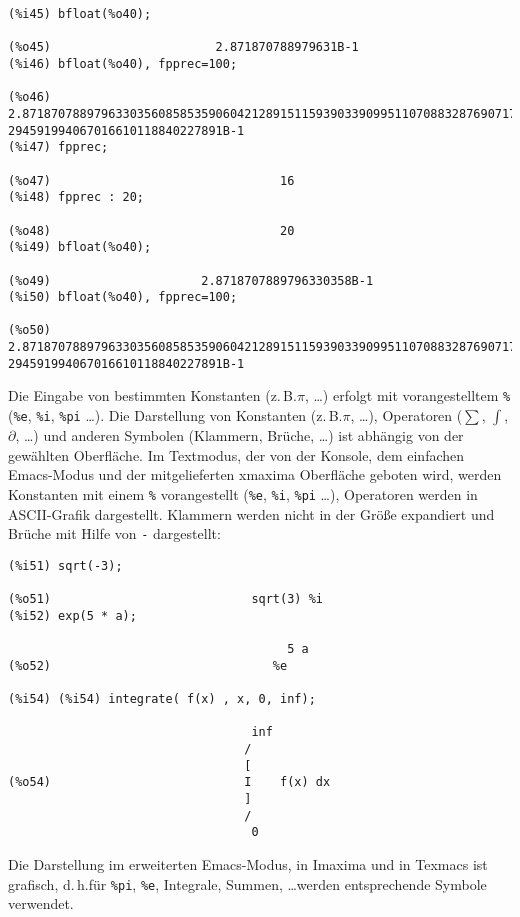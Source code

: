 \documentclass[12pt]{scrartcl}
\newcommand*\zB{z.\,B.\xspace}
\begin{document}
\begin{verbatim}
(%i45) bfloat(%o40);

(%o45)                       2.871870788979631B-1
(%i46) bfloat(%o40), fpprec=100;

(%o46) 2.871870788979633035608585359060421289151159390339099511070883287690717#
294591994067016610118840227891B-1
(%i47) fpprec;

(%o47)                                16
(%i48) fpprec : 20;

(%o48)                                20
(%i49) bfloat(%o40);

(%o49)                     2.8718707889796330358B-1
(%i50) bfloat(%o40), fpprec=100;

(%o50) 2.871870788979633035608585359060421289151159390339099511070883287690717#
294591994067016610118840227891B-1
\end{verbatim}

Die Eingabe von bestimmten Konstanten (\zB $\pi$, \ldots) erfolgt mit
vorangestelltem \texttt{\%} (\texttt{\%e}, \texttt{\%i}, \texttt{\%pi} \ldots).
Die Darstellung von Konstanten (\zB $\pi$, \ldots), Operatoren
($\sum$, $\int$, $\partial$, \ldots) und anderen Symbolen (Klammern,
Brüche, \ldots) ist abhängig von der gewählten Oberfläche. Im
Textmodus, der von der Konsole, dem einfachen Emacs-Modus und der
mitgelieferten xmaxima Oberfläche geboten wird, werden Konstanten mit
einem \texttt{\%} vorangestellt (\texttt{\%e}, \texttt{\%i},
\texttt{\%pi} \ldots), Operatoren werden in ASCII-Grafik dargestellt.
Klammern werden nicht in der Größe expandiert und Brüche mit Hilfe von
\texttt{-} dargestellt:

\begin{verbatim}
(%i51) sqrt(-3);

(%o51)                            sqrt(3) %i
(%i52) exp(5 * a);

                                       5 a
(%o52)                               %e

(%i54) (%i54) integrate( f(x) , x, 0, inf);

                                  inf
                                 /
                                 [
(%o54)                           I    f(x) dx
                                 ]
                                 /
                                  0
\end{verbatim}

Die Darstellung im erweiterten Emacs-Modus, in Imaxima und in Texmacs
ist grafisch, d.\,h.\@ für \texttt{\%pi}, \texttt{\%e}, Integrale,
Summen, \ldots werden entsprechende Symbole verwendet.
\end{document}
